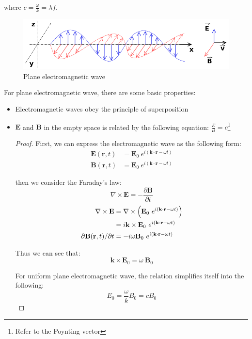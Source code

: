 \documentclass[UTF8]{book}
\begin{document}
where $c=\frac{\omega }{k}=\lambda f$. 
\begin{figure}[H]
\centering
\label{fig:8}
\includegraphics[scale=0.4]{Figure/8.PNG}
\caption{Plane electromagnetic wave}
\end{figure}
For plane electromagnetic wave, there are some basic properties:
\begin{itemize}
\item Electromagnetic waves obey the principle of superposition
\item $\mathbf{E}$ and $\mathbf{B}$ in the empty space is related by the following equation: $\frac{E}{B}=c$\footnote{Refer to the Poynting vector}

\begin{proof}
First, we can express the electromagnetic wave as the following form:
\begin{align*}
\mathbf{E}(\mathbf{r},t) &= \mathbf{E}_0 ~ e^{i(\mathbf{k}\cdot  \mathbf{r} - \omega t)}\\
\mathbf{B}(\mathbf{r},t) &= \mathbf{E}_0 ~ e^{i(\mathbf{k}\cdot  \mathbf{r} - \omega t)}
\end{align*}

then we consider the Faraday's law:
\[\nabla \times \mathbf{E}=-\frac{\partial \mathbf{B}}{\partial t}\]
\begin{align*}
\nabla \times \mathbf{E}&=\nabla \times \Bigl( \mathbf{E}_0 ~ e^{i(\mathbf{k}\cdot  \mathbf{r} - \omega t)} \Bigl)\\
&= i \mathbf{k}\times \mathbf{E}_0 ~ e^{i(\mathbf{k}\cdot  \mathbf{r} - \omega t)}\\
\partial \mathbf{B}(\mathbf{r},t) / \partial t&=- i \omega \mathbf{B}_0 ~ e^{i(\mathbf{k}\cdot  \mathbf{r} - \omega t)}
\end{align*}

Thus we can see that:
\[\mathbf{k} \times \mathbf{E}_0 = \omega ~ \mathbf{B}_0\]

For uniform plane electromagnetic wave, the relation simplifies itself into the following:
\[E_0=\frac{\omega }{k}B_0=cB_0\]
\end{proof}
\end{itemize}
\end{document}
